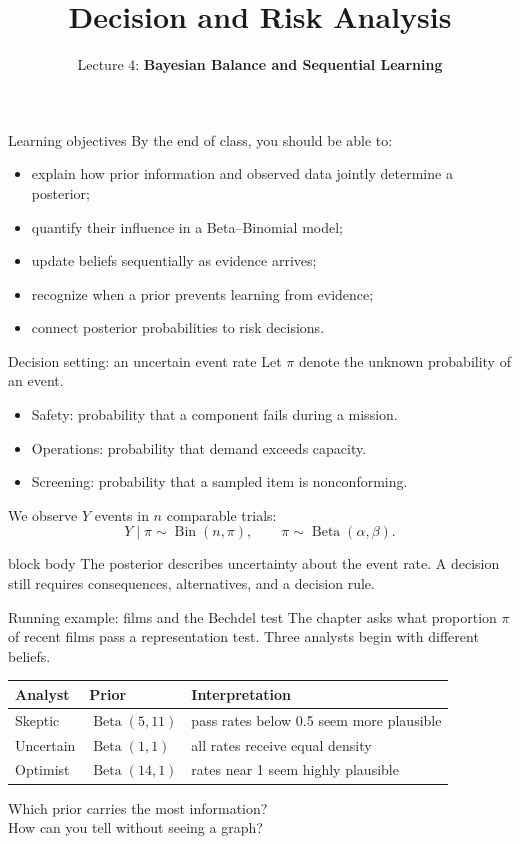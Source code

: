 \documentclass[aspectratio=43,11pt]{beamer}
\title{Decision and Risk Analysis}
\subtitle{Lecture 4: \textbf{Bayesian Balance and Sequential Learning}}
\author{\emph{}}
\date{\color{aggiemaroon}{
DAEN 427 / ISEN 427 / ISEN 627\\
\textbf{Alexander Abuabara}\\
Fall 2026
}}
\newcommand{\riskbox}[1]{\begin{beamercolorbox}[rounded=true,sep=.8em]{block body} #1\end{beamercolorbox}}
\begin{document}
\begin{frame}\titlepage\end{frame}

\begin{frame}{Learning objectives}
By the end of class, you should be able to:
\begin{itemize}
  \item explain how prior information and observed data jointly determine a posterior;
  \item quantify their influence in a Beta--Binomial model;
  \item update beliefs sequentially as evidence arrives;
  \item recognize when a prior prevents learning from evidence;
  \item connect posterior probabilities to risk decisions.
\end{itemize}
\end{frame}

\begin{frame}{Decision setting: an uncertain event rate}
Let $\pi$ denote the unknown probability of an event.
\begin{itemize}
  \item Safety: probability that a component fails during a mission.
  \item Operations: probability that demand exceeds capacity.
  \item Screening: probability that a sampled item is nonconforming.
\end{itemize}
We observe $Y$ events in $n$ comparable trials:
\[
Y\mid \pi \sim \operatorname{Bin}(n,\pi), \qquad
\pi\sim\operatorname{Beta}(\alpha,\beta).
\]
\riskbox{The posterior describes uncertainty about the event rate. A decision still requires consequences, alternatives, and a decision rule.}
\end{frame}

\begin{frame}{Running example: films and the Bechdel test}
The chapter asks what proportion $\pi$ of recent films pass a representation test. Three analysts begin with different beliefs.
\begin{center}
\begin{tabular}{lll}
\toprule
Analyst & Prior & Interpretation \\
\midrule
Skeptic & $\operatorname{Beta}(5,11)$ & pass rates below 0.5 seem more plausible \\
Uncertain & $\operatorname{Beta}(1,1)$ & all rates receive equal density \\
Optimist & $\operatorname{Beta}(14,1)$ & rates near 1 seem highly plausible \\
\bottomrule
\end{tabular}
\end{center}
\vspace{.5em}
Which prior carries the most information?\\
How can you tell without seeing a graph?
\end{frame}
\end{document}
